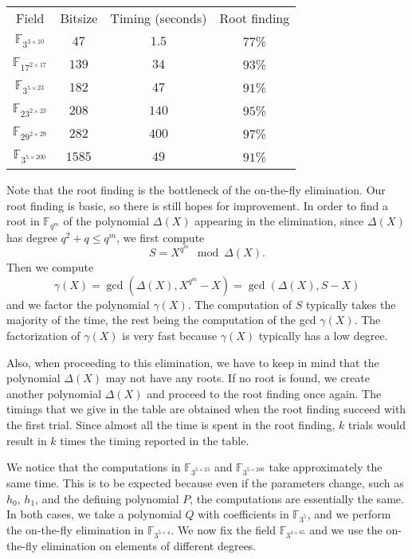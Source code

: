 \documentclass[a4paper,11pt]{article}
\theoremstyle{break}
\theoremstyle{sc}
\theoremstyle{definition}
\theoremstyle{remark}
\begin{document}
\begin{center}
\begin{tabular}[here]{cccc}
  Field & Bitsize & Timing (seconds) & Root finding \\
  $\mathbb{F}_{3^{3\times10}}$ & $47$ & $1.5$ & $77$\% \\
  $\mathbb{F}_{17^{2\times17}}$ & $139$ & $34$ & $93$\% \\
  $\mathbb{F}_{3^{5\times23}}$ & $182$ & $47$ & $91$\% \\
  $\mathbb{F}_{23^{2\times23}}$ & $208$ & $140$ & $95$\% \\
  $\mathbb{F}_{29^{2\times29}}$ & $282$ & $400$ & $97$\% \\
  $\mathbb{F}_{3^{5\times200}}$ & $1585$ & $49$ & $91$\% \\
\end{tabular}
\end{center}

Note that the root finding is the bottleneck of the on-the-fly
elimination. Our root finding is basic, so there is still hopes for improvement.
In order to find a root in $\mathbb{F}_{q^m}$ of the polynomial $\Delta(X)$
appearing in the elimination, since $\Delta(X)$ has degree $q^2+q\leq q^m$, we
first compute 
\[
  S = X^{q^m}\mod \Delta(X).
\]
Then we compute 
\[
  \gamma(X) = \gcd(\Delta(X), X^{q^m}-X)= \gcd(\Delta(X), S-X)
\]
and we factor the polynomial $\gamma(X)$. The computation of $S$ typically takes
the majority of the time, the rest being the computation of the gcd $\gamma(X)$. The
factorization of $\gamma(X)$ is very fast because $\gamma(X)$ typically has a
low degree.

Also, when proceeding to this elimination, we have to keep in mind that the
polynomial $\Delta(X)$ may not have any roots. If no root is found, we create another
polynomial $\Delta(X)$ and proceed to the root finding once again. The timings that we give in
the table are obtained when the root finding succeed with the first trial. Since
almost all the time is spent in the root finding, $k$ trials would result in $k$
times the timing reported in the table.

We notice that the computations in $\mathbb{F}_{3^{5\times23}}$ and
$\mathbb{F}_{3^{5\times200}}$ take approximately the same time. This is to be
expected because even if the
parameters change, such as $h_0$, $h_1$, and the defining polynomial $P$, the
computations are essentially the same. In both cases, we take a polynomial $Q$
with coefficients in $\mathbb{F}_{3^5}$, and we perform the on-the-fly
elimination in $\mathbb{F}_{3^{5\times4}}$. We now fix the field
$\mathbb{F}_{3^{4\times65}}$ and we use the on-the-fly elimination on elements
of different degrees.
\end{document}
